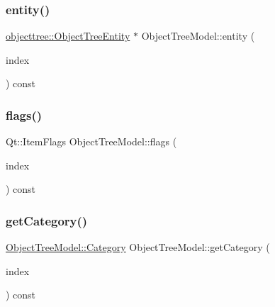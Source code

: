 \mbox{\label{class_object_tree_model_a6b8fb975df04066b195ee756a9fe1427}} 
\subsubsection{\texorpdfstring{entity()}{entity()}}
{\footnotesize\ttfamily \mbox{\hyperlink{classobjecttree_1_1_object_tree_entity}{objecttree\+::\+Object\+Tree\+Entity}} $\ast$ Object\+Tree\+Model\+::entity (\begin{DoxyParamCaption}\item[{const Q\+Model\+Index \&}]{index }\end{DoxyParamCaption}) const}

\mbox{\label{class_object_tree_model_aae7f151eec2e73541be301e04c525f02}} 
\subsubsection{\texorpdfstring{flags()}{flags()}}
{\footnotesize\ttfamily Qt\+::\+Item\+Flags Object\+Tree\+Model\+::flags (\begin{DoxyParamCaption}\item[{const Q\+Model\+Index \&}]{index }\end{DoxyParamCaption}) const}

\mbox{\label{class_object_tree_model_a509feedd50256805227bbadd74b1fe3e}} 
\subsubsection{\texorpdfstring{getCategory()}{getCategory()}}
{\footnotesize\ttfamily \mbox{\hyperlink{class_object_tree_model_a379e9d6b0d381853785adf62095ba4e3}{Object\+Tree\+Model\+::\+Category}} Object\+Tree\+Model\+::get\+Category (\begin{DoxyParamCaption}\item[{Q\+Model\+Index}]{index }\end{DoxyParamCaption}) const}

